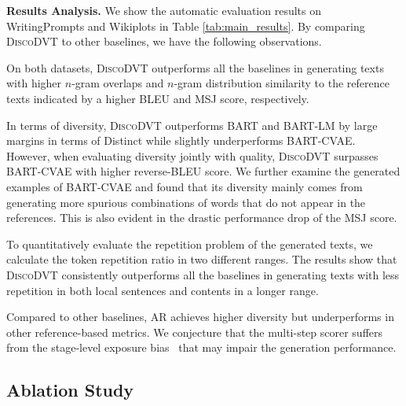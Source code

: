 \documentclass[11pt]{article}
\begin{document}
\noindent\textbf{Results Analysis.} We show the automatic evaluation results on WritingPrompts and Wikiplots in Table \ref{tab:main_results}. 
By comparing \textsc{DiscoDVT} to other baselines, we have the following observations.

On both datasets, \textsc{DiscoDVT} outperforms all the baselines in generating texts with higher $n$-gram overlaps and $n$-gram distribution similarity to the reference texts indicated by a higher BLEU and MSJ score, respectively. 


In terms of diversity, \textsc{DiscoDVT} outperforms BART and BART-LM by large margins in terms of Distinct while slightly underperforms BART-CVAE.
However, when evaluating diversity jointly with quality, \textsc{DiscoDVT} surpasses BART-CVAE with higher reverse-BLEU score. We further examine the generated examples of BART-CVAE and found that its diversity mainly comes from generating more spurious combinations of words that do not appear in the references. This is also evident in the drastic performance drop of the MSJ score.

To quantitatively evaluate the repetition problem of the generated texts, we calculate the token repetition ratio in two different ranges. The results show that \textsc{DiscoDVT} consistently outperforms all the baselines in generating texts with less repetition in both local sentences and contents in a longer range.

Compared to other baselines, AR achieves higher diversity but underperforms in other reference-based metrics. We conjecture that the multi-step scorer suffers from the stage-level exposure bias~\citep{DBLP:journals/corr/abs-2006-15720} that may impair the generation performance.

\subsection{Ablation Study}
\end{document}
